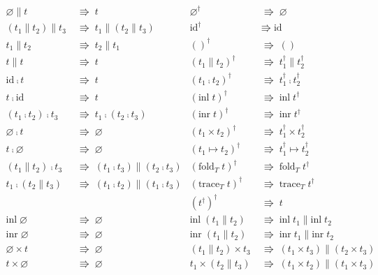 \documentclass{jsarticle}
\newcommand{\reduct}[2]{#1 &\;\Rrightarrow\; #2}
\begin{document}
\begin{figure}[H]
  \begin{align*}
    \reduct{\varnothing\parallel{}t}{t} &
    \reduct{\varnothing^\dagger}{\varnothing} \\
    \reduct{(t_1\parallel{}t_2)\parallel{}t_3}{t_1\parallel(t_2\parallel{}t_3)} &
    \reduct{\text{id}^\dagger}{\text{id}} \\
    \reduct{t_1\parallel{}t_2}{t_2\parallel{}t_1} &
    \reduct{()^\dagger}{()} \\
    \reduct{t\parallel{}t}{t} &
    \reduct{(t_1\parallel{}t_2)^\dagger}{t_1^\dagger\parallel{}t_2^\dagger} \\
    \reduct{\text{id}\fcmp{}t}{t} &
    \reduct{(t_1\fcmp{}t_2)^\dagger}{t_1^\dagger\fcmp{}t_2^\dagger} \\
    \reduct{t\fcmp\text{id}}{t} &
    \reduct{(\text{inl}\;t)^\dagger}{\text{inl}\;t^\dagger} \\
    \reduct{(t_1\fcmp{}t_2)\fcmp{}t_3}{t_1\fcmp(t_2\fcmp{}t_3)} &
    \reduct{(\text{inr}\;t)^\dagger}{\text{inr}\;t^\dagger} \\
    \reduct{\varnothing\fcmp{}t}{\varnothing} &
    \reduct{(t_1\times{}t_2)^\dagger}{t_1^\dagger\times{}t_2^\dagger} \\
    \reduct{t\fcmp\varnothing}{\varnothing} &
    \reduct{(t_1\mapsto{}t_2)^\dagger}{t_1^\dagger\mapsto{}t_2^\dagger} \\
    \reduct{(t_1\parallel{}t_2)\fcmp{}t_3}{(t_1\fcmp{}t_3)\parallel(t_2\fcmp{}t_3)} &
    \reduct{(\text{fold}_T\;t)^\dagger}{\text{fold}_T\;t^\dagger} \\
    \reduct{t_1\fcmp(t_2\parallel{}t_3)}{(t_1\fcmp{}t_2)\parallel(t_1\fcmp{}t_3)} &
    \reduct{(\text{trace}_T\;t)^\dagger}{\text{trace}_T\;t^\dagger} \\
    && \reduct{(t^\dagger)^\dagger}{t} \\
    \reduct{\text{inl}\;\varnothing}{\varnothing} &
    \reduct{\text{inl}\;(t_1\parallel{}t_2)}{\text{inl}\;t_1\parallel\text{inl}\;t_2} \\
    \reduct{\text{inr}\;\varnothing}{\varnothing} &
    \reduct{\text{inr}\;(t_1\parallel{}t_2)}{\text{inr}\;t_1\parallel\text{inr}\;t_2} \\
    \reduct{\varnothing\times{}t}{\varnothing} &
    \reduct{(t_1\parallel{}t_2)\times{}t_3}{(t_1\times{}t_3)\parallel(t_2\times{}t_3)} \\
    \reduct{t\times\varnothing}{\varnothing} &
    \reduct{t_1\times(t_2\parallel{}t_3)}{(t_1\times{}t_2)\parallel(t_1\times{}t_3)} \\

\end{align*}
\end{figure}
\end{document}
